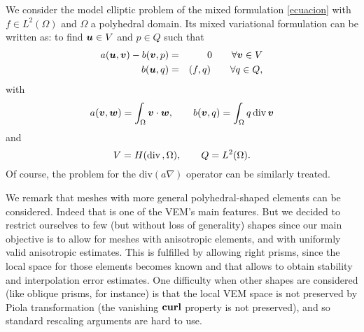 We consider the model elliptic problem of the mixed
formulation \eqref{ecuacion}  with 
$f\in L^2(\Omega)$ and $\Omega$ a polyhedral domain. Its mixed 
variational formulation can be written as: to find $\boldsymbol{u}\in V$ and $p\in Q$ 
such that
\begin{eqnarray}\label{P}
a(\boldsymbol{u},\boldsymbol{v}) - b(\boldsymbol{v},p) & = & 0 \qquad \forall \boldsymbol{v}\in V\\ \nonumber b(\boldsymbol{u},q) &
= & (f,q)\qquad \forall q\in Q,  
\end{eqnarray}
with
\[
a(\boldsymbol{v},\boldsymbol{w})=\int_\Omega\boldsymbol{v}\cdot\boldsymbol{w},\qquad b(\boldsymbol{v},q)=\int_\Omega
q\,\mbox{div\,}\boldsymbol{v}
\]
and
\[
V=H(\mbox{div\,},\Omega), \qquad Q=L^2(\Omega).
\]
Of course, the problem for the $\mbox{div}(a\nabla)$ operator can be similarly treated. 


We remark that meshes with more general polyhedral-shaped elements can be considered. 
Indeed that is one of the VEM's main features. But we decided to restrict ourselves to few (but without loss of generality) 
shapes since our main objective is to allow for meshes with anisotropic elements, and with uniformly valid anisotropic 
estimates. This is fulfilled by allowing right prisms, since the local space for those elements becomes known \cite{nedelec2} 
and that allows to obtain stability and interpolation error estimates. One difficulty when other shapes are considered (like 
oblique prisms, for instance) is that the local VEM space is not preserved by Piola transformation (the vanishing ${\bf curl}$ 
property is not preserved), and so standard rescaling arguments are hard to use.  


